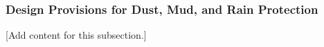 
\subsubsection{Design Provisions for Dust, Mud, and Rain Protection}
\label{subsubsec:design_10_2_dust_mud_rain_protection}

[Add content for this subsection.]
